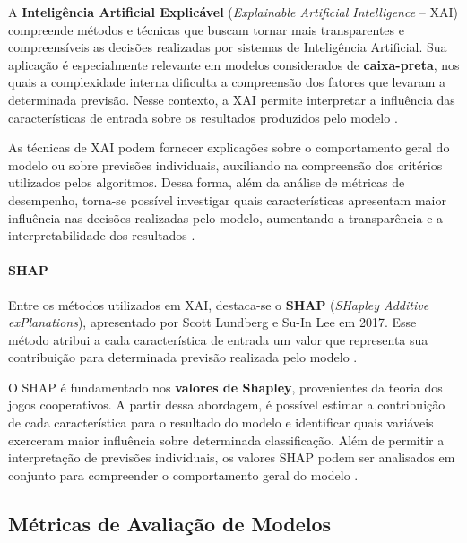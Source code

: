 \documentclass[
    12pt,                %
    openright,           %
    oneside,             %
    a4paper,             %
    english,             %
    brazil               %
]{abntex2}
\begin{document}
A \textbf{Inteligência Artificial Explicável} (\textit{Explainable Artificial Intelligence} -- XAI) compreende métodos e técnicas que buscam tornar mais transparentes e compreensíveis as decisões realizadas por sistemas de Inteligência Artificial. Sua aplicação é especialmente relevante em modelos considerados de \textbf{caixa-preta}, nos quais a complexidade interna dificulta a compreensão dos fatores que levaram a determinada previsão. Nesse contexto, a XAI permite interpretar a influência das características de entrada sobre os resultados produzidos pelo modelo \cite{minh2022}.

As técnicas de XAI podem fornecer explicações sobre o comportamento geral do modelo ou sobre previsões individuais, auxiliando na compreensão dos critérios utilizados pelos algoritmos. Dessa forma, além da análise de métricas de desempenho, torna-se possível investigar quais características apresentam maior influência nas decisões realizadas pelo modelo, aumentando a transparência e a interpretabilidade dos resultados \cite{minh2022}.

\paragraph{SHAP}

Entre os métodos utilizados em XAI, destaca-se o \textbf{SHAP} (\textit{SHapley Additive exPlanations}), apresentado por Scott Lundberg e Su-In Lee em 2017. Esse método atribui a cada característica de entrada um valor que representa sua contribuição para determinada previsão realizada pelo modelo \cite{lundberg2017}.

O SHAP é fundamentado nos \textbf{valores de Shapley}, provenientes da teoria dos jogos cooperativos. A partir dessa abordagem, é possível estimar a contribuição de cada característica para o resultado do modelo e identificar quais variáveis exerceram maior influência sobre determinada classificação. Além de permitir a interpretação de previsões individuais, os valores SHAP podem ser analisados em conjunto para compreender o comportamento geral do modelo \cite{lundberg2017}.

\subsection{Métricas de Avaliação de Modelos}
\end{document}

